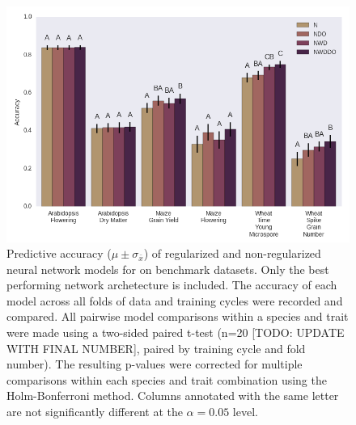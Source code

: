 
\begin{figure}[htbp]
\renewcommand{\familydefault}{\sfdefault}\normalfont
\centering 
\includegraphics[width=\linewidth]{g3_article/figures/network_comparison.png}
    \caption{Predictive accuracy ($\mu \pm \sigma_{\bar{x}}$) of 
             regularized and non-regularized 
             neural network models for on benchmark datasets. Only the best performing
             network archetecture is included. The accuracy of each model across all 
             folds of data and training cycles were recorded and compared. All pairwise 
             model comparisons within a species and trait were made using a two-sided paired t-test 
             (n=20 [TODO: UPDATE WITH FINAL NUMBER], paired by training cycle and fold number). 
             The resulting p-values were corrected for multiple comparisons within each 
             species and trait combination using the Holm-Bonferroni method. Columns annotated 
             with the same letter are not significantly different 
             at the $\alpha=0.05$ level.}
\label{fig:network-comparison}
\end{figure}
